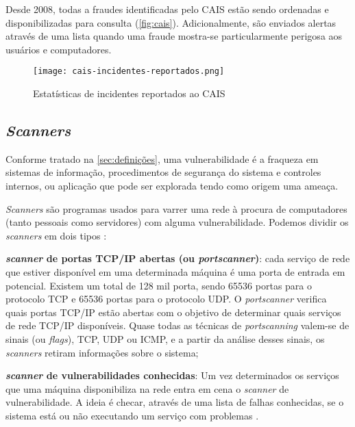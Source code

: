 Desde 2008, todas a fraudes identificadas pelo CAIS estão sendo ordenadas e disponibilizadas para consulta (\autoref{fig:cais}). Adicionalmente, são enviados alertas através de uma lista quando uma fraude mostra-se particularmente perigosa aos usuários e computadores.

\begin{figure}[htb]
 \centering
 \caption{Estatísticas de incidentes reportados ao CAIS}
 \texttt{[image: cais-incidentes-reportados.png]}
 \label{fig:cais}
\end{figure}

\subsection{\textit{Scanners}} \label{sec:scanners}

Conforme tratado na \autoref{sec:definições}, uma vulnerabilidade é a fraqueza em sistemas de informação, procedimentos de segurança do sistema e controles internos, ou aplicação que pode ser explorada tendo como origem uma ameaça. 

\textit{Scanners} são programas usados para varrer uma rede à procura de computadores (tanto pessoais como servidores) com alguma vulnerabilidade. Podemos dividir os \textit{scanners} em dois tipos \cite{univhacker}: 

\begin{alineas}
\item \textbf{\textit{scanner} de portas TCP/IP abertas (ou \textit{portscanner})}: cada serviço de rede que estiver disponível em uma determinada máquina é uma porta de entrada em potencial. Existem um total de 128 mil porta, sendo 65536 portas para o protocolo TCP e 65536 portas para o protocolo UDP. O \textit{portscanner} verifica quais portas TCP/IP estão abertas com o objetivo de determinar quais serviços de rede TCP/IP disponíveis. Quase todas as técnicas de \textit{portscanning} valem-se de sinais (ou \textit{flags}), TCP, UDP ou ICMP, e a partir da análise desses sinais, os \textit{scanners} retiram informações sobre o sistema; \cite{univhacker}
\item \textbf{\textit{scanner} de vulnerabilidades conhecidas}: Um vez determinados os serviços que uma máquina disponibiliza na rede entra em cena o \textit{scanner} de vulnerabilidade. A ideia é checar, através de uma lista de falhas conhecidas, se o sistema está ou não executando um serviço com problemas \cite{univhacker}. 
\end{alineas}

